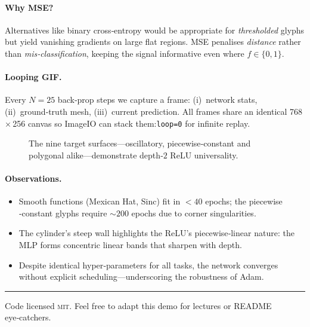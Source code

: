 \documentclass[11pt]{article}
\begin{document}
\paragraph{Why MSE?} Alternatives like binary cross‑entropy would be appropriate for
\emph{thresholded} glyphs but yield vanishing gradients on large flat regions.
MSE penalises \emph{distance} rather than \emph{mis‑classification}, keeping the
signal informative even where $f\in\{0,1\}$.

\paragraph{Looping GIF.} Every $N=25$ back‑prop steps we capture a frame: (i)~network
stats, (ii)~ground‑truth mesh, (iii)~current prediction. All frames share an
identical 768\,×\,256 canvas so ImageIO can stack them:\@\verb|loop=0| for
infinite replay.

\begin{figure}[h]
\centering
{}
\caption{The nine target surfaces—oscillatory, piecewise‑constant and
polygonal alike—demonstrate depth‑\(2\) ReLU universality.}
\label{fig:glyphs}
\end{figure}

\paragraph{Observations.}\vspace{-0.3em}
\begin{itemize}[leftmargin=1.2em,itemsep=0.1em]
  \item Smooth functions (Mexican Hat, Sinc) fit in \(<40\) epochs; the piecewise
        ‑constant glyphs require \(\sim200\) epochs due to corner singularities.
  \item The cylinder’s steep wall highlights the ReLU’s piecewise‑linear nature:
        the MLP forms concentric linear bands that sharpen with depth.
  \item Despite identical hyper‑parameters for all tasks, the network converges
        without explicit scheduling—underscoring the robustness of Adam.
\end{itemize}

\vspace{-1em}
\begin{center}\rule{0.85\linewidth}{0.3pt}\end{center}
\noindent\footnotesize Code licensed \textsc{mit}.  Feel free to adapt this demo
for lectures or README eye‑catchers.
\end{document}
